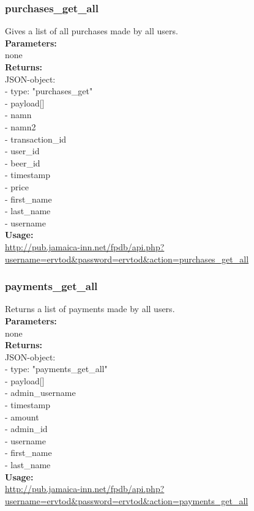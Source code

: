 \documentclass{article}
\begin{document}
\subsubsection{purchases\_get\_all}
Gives a list of all purchases made by all users.\\
\textbf{Parameters:}\\
none\\
\textbf{Returns:}\\
JSON-object:\\
- type: "purchases\_get"\\
- payload[]\\
\indent - namn\\
\indent - namn2\\
\indent - transaction\_id\\
\indent - user\_id\\
\indent - beer\_id\\
\indent - timestamp\\
\indent - price\\
\indent - first\_name\\
\indent - last\_name\\
\indent - username\\
\textbf{Usage:}\\
\url{http://pub.jamaica-inn.net/fpdb/api.php?username=ervtod\&password=ervtod\&action=purchases\_get\_all}\\

\subsubsection{payments\_get\_all}
Returns a list of payments made by all users.\\
\textbf{Parameters:}\\
none\\
\textbf{Returns:}\\
JSON-object:\\
- type: "payments\_get\_all"\\
- payload[]\\
\indent - admin\_username\\
\indent - timestamp\\
\indent - amount\\
\indent - admin\_id\\
\indent - username\\
\indent - first\_name\\
\indent - last\_name\\
\textbf{Usage:}\\
\url{http://pub.jamaica-inn.net/fpdb/api.php?username=ervtod\&password=ervtod\&action=payments\_get\_all}\\
 
\end{document}
